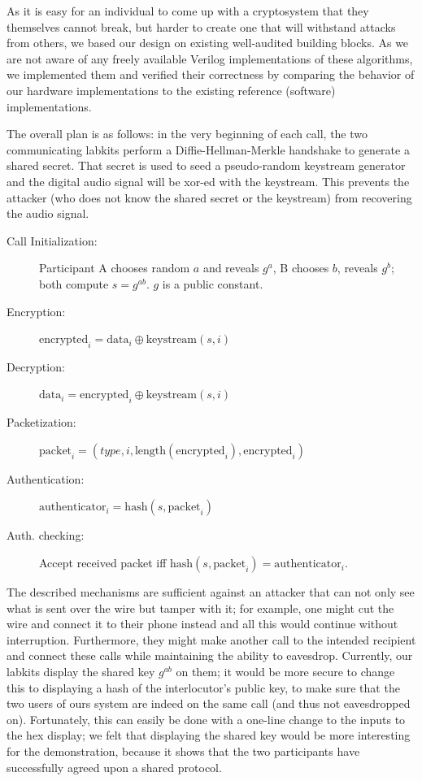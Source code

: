 \documentclass[a4paper]{report}
\begin{document}
As it is easy for an individual to come up with a cryptosystem that they
themselves cannot break, but harder to create one that will %
withstand attacks
from others, we based our design on existing well-audited building
blocks. As we are not aware of any freely available Verilog implementations of
these algorithms, we implemented them and verified their correctness by
comparing the behavior of our hardware implementations to the existing reference
(software) implementations.

The overall plan is as follows: in the very beginning of each call, the two
communicating labkits perform a Diffie-Hellman-Merkle handshake to generate a
shared secret. That secret is used to seed a pseudo-random keystream
generator and the digital audio signal will be xor-ed with the keystream.
This prevents the attacker (who does not know the shared secret or the
keystream) from recovering the audio signal. 

\begin{description}
  \item[Call Initialization:] Participant A chooses random $a$ and reveals $g^a$,
	  B chooses $b$, reveals $g^b$; both compute $s=g^{ab}$. $g$ is a public constant.
  \item[Encryption:] $\text{encrypted}_i = \text{data}_i \mathbin{\oplus} \text{keystream}(s,i)$
  \item[Decryption:] $\text{data}_i = \text{encrypted}_i \mathbin{\oplus} \text{keystream}(s,i)$
  \item[Packetization:] $\text{packet}_i = \left(type, i, \text{length}(\text{encrypted}_i), \text{encrypted}_i\right)$
  \item[Authentication:] $\text{authenticator}_i = \text{hash}(s, \text{packet}_i)$
  \item[Auth. checking:] Accept received packet iff $\text{hash}(s, \text{packet}_i) = \text{authenticator}_i$.
\end{description}

The described mechanisms are sufficient against an attacker that can not only see
what is sent over the wire but tamper with it; for example, one might cut the
wire and connect it to their phone instead and all this would continue without
interruption. Furthermore, they might make another call to the intended
recipient and connect these calls while maintaining the ability to eavesdrop. Currently, our labkits display the shared key $g^{ab}$ on them; it would be more secure to change this to displaying a hash of the interlocutor's public key, to
make sure that the two users of ours system are indeed on the same call (and
thus not eavesdropped on). Fortunately, this can easily be done with a one-line change to the inputs to the hex display; we felt that displaying the shared key would be more interesting for the demonstration, because it shows that the two participants have successfully agreed upon a shared protocol. 
\end{document}
